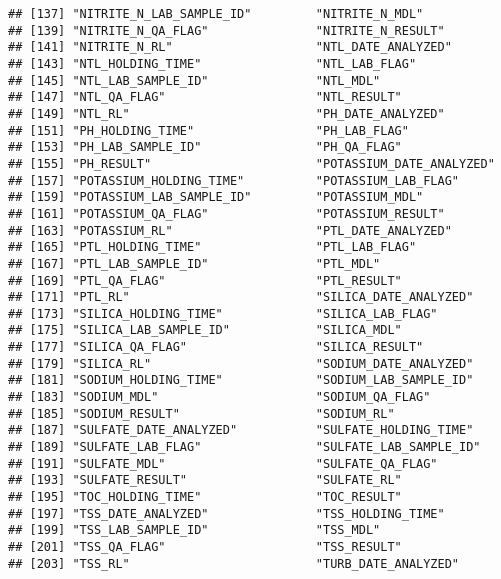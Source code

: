 \documentclass[]{article}
\begin{document}
\begin{verbatim}
## [137] "NITRITE_N_LAB_SAMPLE_ID"         "NITRITE_N_MDL"                  
## [139] "NITRITE_N_QA_FLAG"               "NITRITE_N_RESULT"               
## [141] "NITRITE_N_RL"                    "NTL_DATE_ANALYZED"              
## [143] "NTL_HOLDING_TIME"                "NTL_LAB_FLAG"                   
## [145] "NTL_LAB_SAMPLE_ID"               "NTL_MDL"                        
## [147] "NTL_QA_FLAG"                     "NTL_RESULT"                     
## [149] "NTL_RL"                          "PH_DATE_ANALYZED"               
## [151] "PH_HOLDING_TIME"                 "PH_LAB_FLAG"                    
## [153] "PH_LAB_SAMPLE_ID"                "PH_QA_FLAG"                     
## [155] "PH_RESULT"                       "POTASSIUM_DATE_ANALYZED"        
## [157] "POTASSIUM_HOLDING_TIME"          "POTASSIUM_LAB_FLAG"             
## [159] "POTASSIUM_LAB_SAMPLE_ID"         "POTASSIUM_MDL"                  
## [161] "POTASSIUM_QA_FLAG"               "POTASSIUM_RESULT"               
## [163] "POTASSIUM_RL"                    "PTL_DATE_ANALYZED"              
## [165] "PTL_HOLDING_TIME"                "PTL_LAB_FLAG"                   
## [167] "PTL_LAB_SAMPLE_ID"               "PTL_MDL"                        
## [169] "PTL_QA_FLAG"                     "PTL_RESULT"                     
## [171] "PTL_RL"                          "SILICA_DATE_ANALYZED"           
## [173] "SILICA_HOLDING_TIME"             "SILICA_LAB_FLAG"                
## [175] "SILICA_LAB_SAMPLE_ID"            "SILICA_MDL"                     
## [177] "SILICA_QA_FLAG"                  "SILICA_RESULT"                  
## [179] "SILICA_RL"                       "SODIUM_DATE_ANALYZED"           
## [181] "SODIUM_HOLDING_TIME"             "SODIUM_LAB_SAMPLE_ID"           
## [183] "SODIUM_MDL"                      "SODIUM_QA_FLAG"                 
## [185] "SODIUM_RESULT"                   "SODIUM_RL"                      
## [187] "SULFATE_DATE_ANALYZED"           "SULFATE_HOLDING_TIME"           
## [189] "SULFATE_LAB_FLAG"                "SULFATE_LAB_SAMPLE_ID"          
## [191] "SULFATE_MDL"                     "SULFATE_QA_FLAG"                
## [193] "SULFATE_RESULT"                  "SULFATE_RL"                     
## [195] "TOC_HOLDING_TIME"                "TOC_RESULT"                     
## [197] "TSS_DATE_ANALYZED"               "TSS_HOLDING_TIME"               
## [199] "TSS_LAB_SAMPLE_ID"               "TSS_MDL"                        
## [201] "TSS_QA_FLAG"                     "TSS_RESULT"                     
## [203] "TSS_RL"                          "TURB_DATE_ANALYZED"             

\end{verbatim}
\end{document}
